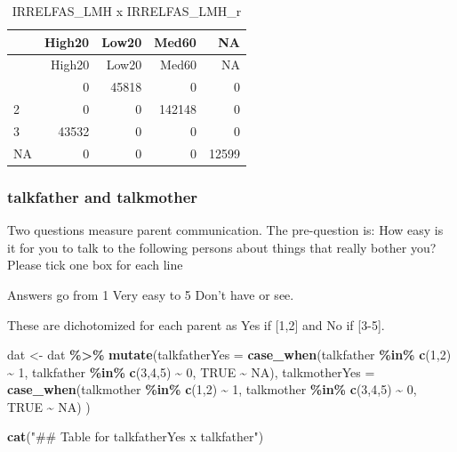 \documentclass[
]{article}
\newenvironment{Shaded}{\begin{snugshade}}{\end{snugshade}}
\newcommand{\AttributeTok}[1]{\textcolor[rgb]{0.13,0.29,0.53}{#1}}
\newcommand{\ConstantTok}[1]{\textcolor[rgb]{0.56,0.35,0.01}{#1}}
\newcommand{\DecValTok}[1]{\textcolor[rgb]{0.00,0.00,0.81}{#1}}
\newcommand{\FunctionTok}[1]{\textcolor[rgb]{0.13,0.29,0.53}{\textbf{#1}}}
\newcommand{\NormalTok}[1]{#1}
\newcommand{\OtherTok}[1]{\textcolor[rgb]{0.56,0.35,0.01}{#1}}
\newcommand{\SpecialCharTok}[1]{\textcolor[rgb]{0.81,0.36,0.00}{\textbf{#1}}}
\newcommand{\StringTok}[1]{\textcolor[rgb]{0.31,0.60,0.02}{#1}}
\begin{document}
\begin{longtable}[]{@{}lrrrr@{}}
\caption{IRRELFAS\_LMH x IRRELFAS\_LMH\_r}\tabularnewline
\toprule\noalign{}
& High20 & Low20 & Med60 & NA \\
\midrule\noalign{}
\endfirsthead
\toprule\noalign{}
& High20 & Low20 & Med60 & NA \\
\midrule\noalign{}
\endhead
\bottomrule\noalign{}
\endlastfoot
1 & 0 & 45818 & 0 & 0 \\
2 & 0 & 0 & 142148 & 0 \\
3 & 43532 & 0 & 0 & 0 \\
NA & 0 & 0 & 0 & 12599 \\
\end{longtable}

\subsubsection{talkfather and
talkmother}\label{talkfather-and-talkmother}

Two questions measure parent communication. The pre-question is: How
easy is it for you to talk to the following persons about things that
really bother you? Please tick one box for each line

Answers go from 1 Very easy to 5 Don't have or see.

These are dichotomized for each parent as Yes if {[}1,2{]} and No if
{[}3-5{]}.

\begin{Shaded}
\begin{Highlighting}[]
\NormalTok{dat }\OtherTok{\textless{}{-}}\NormalTok{ dat }\SpecialCharTok{\%\textgreater{}\%}
  \FunctionTok{mutate}\NormalTok{(}\AttributeTok{talkfatherYes =} 
           \FunctionTok{case\_when}\NormalTok{(talkfather }\SpecialCharTok{\%in\%} \FunctionTok{c}\NormalTok{(}\DecValTok{1}\NormalTok{,}\DecValTok{2}\NormalTok{) }\SpecialCharTok{\textasciitilde{}} \DecValTok{1}\NormalTok{,}
\NormalTok{                     talkfather }\SpecialCharTok{\%in\%} \FunctionTok{c}\NormalTok{(}\DecValTok{3}\NormalTok{,}\DecValTok{4}\NormalTok{,}\DecValTok{5}\NormalTok{) }\SpecialCharTok{\textasciitilde{}} \DecValTok{0}\NormalTok{,}
                     \ConstantTok{TRUE} \SpecialCharTok{\textasciitilde{}} \ConstantTok{NA}\NormalTok{),}
         \AttributeTok{talkmotherYes =} 
           \FunctionTok{case\_when}\NormalTok{(talkmother }\SpecialCharTok{\%in\%} \FunctionTok{c}\NormalTok{(}\DecValTok{1}\NormalTok{,}\DecValTok{2}\NormalTok{) }\SpecialCharTok{\textasciitilde{}} \DecValTok{1}\NormalTok{,}
\NormalTok{                     talkmother }\SpecialCharTok{\%in\%} \FunctionTok{c}\NormalTok{(}\DecValTok{3}\NormalTok{,}\DecValTok{4}\NormalTok{,}\DecValTok{5}\NormalTok{) }\SpecialCharTok{\textasciitilde{}} \DecValTok{0}\NormalTok{,}
                     \ConstantTok{TRUE} \SpecialCharTok{\textasciitilde{}} \ConstantTok{NA}\NormalTok{)}
\NormalTok{         )}

\FunctionTok{cat}\NormalTok{(}\StringTok{"\#\# Table for talkfatherYes x talkfather"}\NormalTok{)}
\end{Highlighting}
\end{Shaded}
\end{document}
